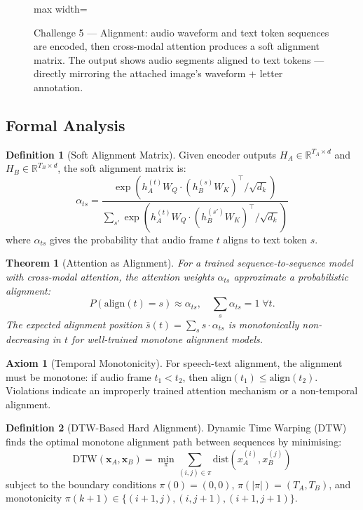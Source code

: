 \documentclass[12pt,a4paper]{article}
\theoremstyle{definition}
\newtheorem{definition}{Definition}[section]
\newtheorem{axiom}{Axiom}[section]
\theoremstyle{plain}
\newtheorem{theorem}{Theorem}[section]
\theoremstyle{remark}
\newcommand{\R}{\mathbb{R}}
\begin{document}
\begin{figure}[H]
\begin{adjustbox}{max width=\textwidth}
\end{adjustbox}
\caption{Challenge 5 — Alignment: audio waveform and text token sequences are encoded, then cross-modal attention produces a soft alignment matrix. The output shows audio segments aligned to text tokens — directly mirroring the attached image's waveform + letter annotation.}
\label{fig:align}
\end{figure}

\subsection{Formal Analysis}

\begin{definition}[Soft Alignment Matrix]
Given encoder outputs $H_A \in \R^{T_A \times d}$ and $H_B \in \R^{T_B \times d}$, the soft alignment matrix is:
\[
  \alpha_{ts} = \frac{\exp(h_A^{(t)} W_Q \cdot (h_B^{(s)} W_K)^\top / \sqrt{d_k})}
               {\sum_{s'} \exp(h_A^{(t)} W_Q \cdot (h_B^{(s')} W_K)^\top / \sqrt{d_k})}
\]
where $\alpha_{ts}$ gives the probability that audio frame $t$ aligns to text token $s$.
\end{definition}

\begin{theorem}[Attention as Alignment]
\label{thm:attn_align}
For a trained sequence-to-sequence model with cross-modal attention, the attention weights $\alpha_{ts}$ approximate a probabilistic alignment:
\[
  P(\text{align}(t) = s) \approx \alpha_{ts}, \quad \sum_s \alpha_{ts} = 1 \;\forall t.
\]
The expected alignment position $\bar{s}(t) = \sum_s s \cdot \alpha_{ts}$ is monotonically non-decreasing in $t$ for well-trained monotone alignment models.
\end{theorem}

\begin{axiom}[Temporal Monotonicity]
\label{ax:monotone}
For speech-text alignment, the alignment must be monotone: if audio frame $t_1 < t_2$, then $\text{align}(t_1) \le \text{align}(t_2)$. Violations indicate an improperly trained attention mechanism or a non-temporal alignment.
\end{axiom}

\begin{definition}[DTW-Based Hard Alignment]
Dynamic Time Warping (DTW) finds the optimal monotone alignment path between sequences by minimising:
\[
  \text{DTW}(\mathbf{x}_A, \mathbf{x}_B) = \min_\pi \sum_{(i,j) \in \pi} \text{dist}(x_A^{(i)}, x_B^{(j)})
\]
subject to the boundary conditions $\pi(0) = (0,0)$, $\pi(|\pi|) = (T_A, T_B)$, and monotonicity $\pi(k+1) \in \{(i{+}1,j), (i,j{+}1), (i{+}1,j{+}1)\}$.
\end{definition}
\end{document}
